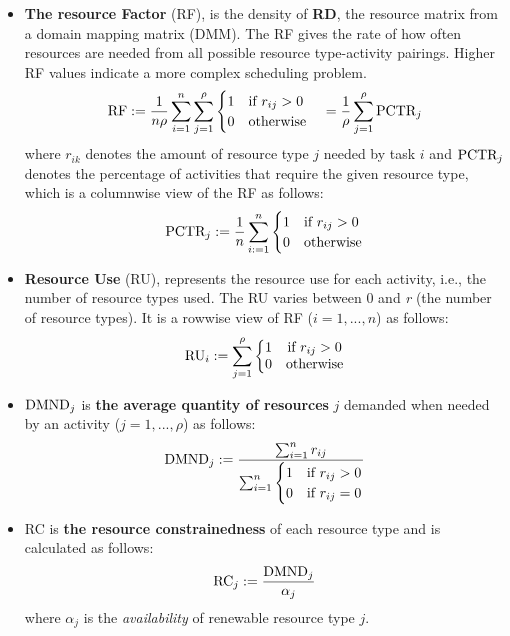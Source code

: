 \documentclass[preprint,
3p]{elsarticle} %
\begin{document}
\begin{appendices}
\begin{itemize}
\item
  \textbf{The resource Factor} (RF), is the density of \textbf{RD}, the
  resource matrix from a domain mapping matrix (DMM). The RF gives the
  rate of how often resources are needed from all possible resource
  type-activity pairings. Higher RF values indicate a more complex
  scheduling problem. \begin{equation}
    \label{eq:RF}
    \textnormal{RF}
    :=\frac{1}{n\rho}\sum_{i=1}^{n}\sum_{j=1}^{\rho}\begin{cases} 1 & \textnormal{if } r_{ij}>0 \\ 0 & \textnormal{otherwise}  \end{cases} \quad 
    =\frac{1}{\rho}\sum_{j=1}^{\rho}{\textnormal{PCTR}_{j}}
    \end{equation} \noindent where \(r_{ik}\) denotes the amount of
  resource type \(j\) needed by task \(i\) and \(\textnormal{PCTR}_j\)
  denotes the percentage of activities that require the given resource
  type, which is a columnwise view of the RF as follows:
  \begin{equation}
    \label{eq:PCTR}
    \textnormal{PCTR}_{j}:=\frac{1}{n} \sum_{i:=1}^n \begin{cases} 1 & \textnormal{if } r_{ij}>0 \\0 & \textnormal{otherwise}  \end{cases}
  \end{equation}
\item
  \textbf{Resource Use} (RU), represents the resource use for each
  activity, i.e., the number of resource types used. The RU varies
  between 0 and \textit{r} (the number of resource types). It is a
  rowwise view of RF (\(i=1,...,n\)) as follows: \begin{equation}
     \label{eq:RU}
     \textnormal{RU}_i := \sum_{j=1}^{\rho}  \left\{\begin{matrix} 1  &\textnormal{if } r_{ij}>0  \\  0 & \textnormal{otherwise} \end{matrix}\right.
   \end{equation}
\item
  \(\textnormal{DMND}_j\) is \textbf{the average quantity of resources}
  \(j\) demanded when needed by an activity (\(j=1,...,\rho\)) as
  follows: \begin{equation}
  \label{eq:DMND}
    \textnormal{DMND}_j:=\frac{\sum_{i=1}^n r_{ij}}{\sum_{i=1}^n \begin{cases} 1 & \text{if } r_{ij}>0 \\ 0 & \text{if } r_{ij}=0 \end{cases}}
  \end{equation}
\item
  RC is \textbf{the resource constrainedness} of each resource type and
  is calculated as follows: \begin{equation}
  \label{eq:RC}
    \textnormal{RC}_{j}:=\frac{\textnormal{DMND}_{j}}{\alpha_{j}}
  \end{equation} \noindent where \(\alpha_{j}\) is the
  \emph{availability} of renewable resource type \(j\).
\end{itemize}


\end{appendices}
\end{document}
